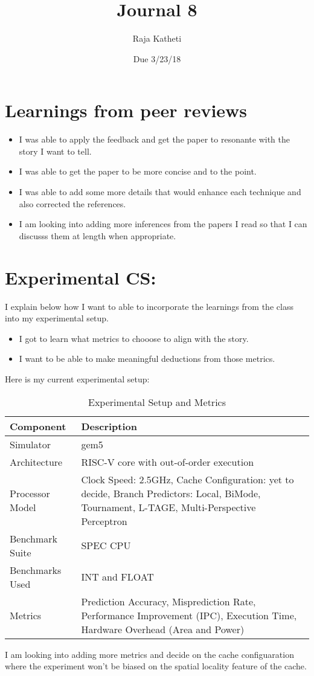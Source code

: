 \documentclass[10pt]{article}
\title{Journal 8}
\date{Due 3/23/18}
\author{Raja Katheti}
\begin{document}
\maketitle
\section{Learnings from peer reviews}
\begin{itemize}
    \item I was able to apply the feedback and get the paper to resonante with the story I want to tell. 
    \item I was able to get the paper to be more concise and to the point.
    \item I was able to add some more details that would enhance each technique and also corrected the references.
    \item I am looking into adding more inferences from the papers I read so that I can discusss them at length when appropriate. 
\end{itemize}
\section{Experimental CS:}
I explain below how I want to able to incorporate the learnings from the class into my experimental setup.
\begin{itemize}
    \item I got to learn what metrics to chooose to align with the story. 
    \item I want to be able to make meaningful deductions from those metrics.
\end{itemize}

Here is my current experimental setup:
\begin{table}[ht]
    \centering
    \caption{Experimental Setup and Metrics}
    \begin{tabular}{|p{4cm}|p{10cm}|} %
        \hline %
        \textbf{Component} & \textbf{Description} \\
        \hline %
        Simulator & gem5 \\
        \hline %
        Architecture & RISC-V core with out-of-order execution \\
        \hline %
        Processor Model & Clock Speed: 2.5GHz, Cache Configuration: yet to decide, Branch Predictors: Local, BiMode, Tournament, L-TAGE, Multi-Perspective Perceptron \\
        \hline %
        Benchmark Suite & SPEC CPU \\
        \hline %
        Benchmarks Used & INT and FLOAT \\
        \hline %
        Metrics & Prediction Accuracy, Misprediction Rate, Performance Improvement (IPC), Execution Time, Hardware Overhead (Area and Power) \\
        \hline %
    \end{tabular}
\end{table}
I am looking into adding more metrics and decide on the cache configuaration where the experiment won't be biased on the spatial locality feature of the cache. 
\end{document}
